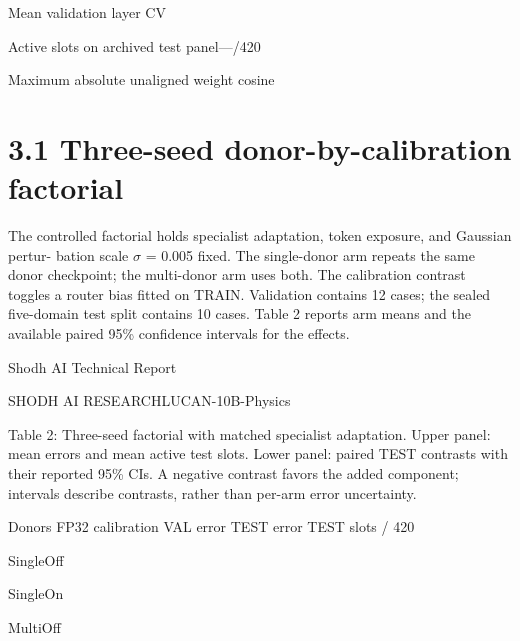 \documentclass[11pt]{article}
\begin{document}
\noindent Mean validation layer CV\par


\noindent Active slots on archived test panel\quad —/420\par


\noindent Maximum absolute unaligned weight cosine\par



\section*{3.1 Three-seed donor-by-calibration factorial}

The controlled factorial holds specialist adaptation, token exposure, and Gaussian pertur-
bation scale \ensuremath{\sigma} = 0.005 fixed. The single-donor arm repeats the same donor checkpoint; the
multi-donor arm uses both. The calibration contrast toggles a router bias fitted on TRAIN.
Validation contains 12 cases; the sealed five-domain test split contains 10 cases. Table 2
reports arm means and the available paired 95\% confidence intervals for the effects.





\noindent Shodh AI Technical Report\par




\noindent SHODH AI RESEARCH\quad LUCAN-10B-Physics\par



Table 2: Three-seed factorial with matched specialist adaptation. Upper panel: mean errors and
mean active test slots. Lower panel: paired TEST contrasts with their reported 95\% CIs. A
negative contrast favors the added component; intervals describe contrasts, rather than per-arm
error uncertainty.

Donors FP32 calibration VAL error TEST error TEST slots / 420

\noindent Single\quad Off\par


\noindent Single\quad On\par


\noindent Multi\quad Off\par
\end{document}
